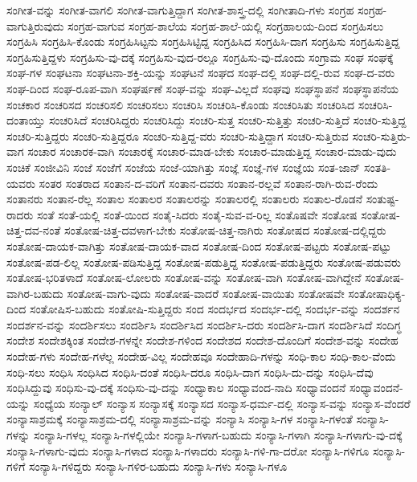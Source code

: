 {ಸಂಗೀತ-ವನ್ನು
ಸಂಗೀತ-ವಾಗಲಿ
ಸಂಗೀತ-ವಾಗುತ್ತಿದ್ದಾಗ
ಸಂಗೀತ-ಶಾಸ್ತ್ರ-ದಲ್ಲಿ
ಸಂಗೀತಾದಿ-ಗಳು
ಸಂಗ್ರಹ
ಸಂಗ್ರಹ-ವಾಗುತ್ತಿರುವುದು
ಸಂಗ್ರಹ-ವಾಗುವ
ಸಂಗ್ರಹ-ಶಾಲೆಯ
ಸಂಗ್ರಹ-ಶಾಲೆ-ಯಲ್ಲಿ
ಸಂಗ್ರಹಾಲಯ-ದಿಂದ
ಸಂಗ್ರಹಿಸಲು
ಸಂಗ್ರಹಿಸಿ
ಸಂಗ್ರಹಿಸಿ-ಕೊಂಡು
ಸಂಗ್ರಹಿಸಿಟ್ಟನು
ಸಂಗ್ರಹಿಸಿಟ್ಟಿದ್ದ
ಸಂಗ್ರಹಿಸಿದ
ಸಂಗ್ರಹಿಸಿ-ದಾಗ
ಸಂಗ್ರಹಿಸು
ಸಂಗ್ರಹಿಸುತ್ತಿದ್ದ
ಸಂಗ್ರಹಿಸುತ್ತಿದ್ದಳು
ಸಂಗ್ರಹಿಸು-ವು-ದಕ್ಕೆ
ಸಂಗ್ರಹಿಸು-ವುದ-ರಲ್ಲೂ
ಸಂಗ್ರಹಿಸು-ವು-ದೊಂದು
ಸಂಗ್ರಾಮ
ಸಂಘ
ಸಂಘಕ್ಕೆ
ಸಂಘ-ಗಳ
ಸಂಘಟನಾ
ಸಂಘಟನಾ-ಶಕ್ತಿ-ಯನ್ನು
ಸಂಘಟನೆ
ಸಂಘದ
ಸಂಘ-ದಲ್ಲಿ
ಸಂಘ-ದಲ್ಲಿ-ರುವ
ಸಂಘ-ದ-ವರು
ಸಂಘ-ದಿಂದ
ಸಂಘ-ರೂಪ-ವಾಗಿ
ಸಂಘರ್ಷಣೆ
ಸಂಘ-ವನ್ನು
ಸಂಘ-ವಿಲ್ಲದೆ
ಸಂಘವು
ಸಂಘಸ್ಥಾಪನೆ
ಸಂಘಸ್ಥಾಪನೆಯ
ಸಂಚಕಾರ
ಸಂಚರಿಸದ
ಸಂಚರಿಸಲಿ
ಸಂಚರಿಸಲು
ಸಂಚರಿಸಿ
ಸಂಚರಿಸಿ-ಕೊಂಡು
ಸಂಚರಿಸಿತು
ಸಂಚರಿಸಿದ
ಸಂಚರಿಸಿ-ದಂತಾಯ್ತು
ಸಂಚರಿಸಿದೆ
ಸಂಚರಿಸಿದ್ದರು
ಸಂಚರಿಸಿದ್ದು
ಸಂಚರಿ-ಸುತ್ತ
ಸಂಚರಿ-ಸುತ್ತಿತ್ತು
ಸಂಚರಿ-ಸುತ್ತಿದೆ
ಸಂಚರಿ-ಸುತ್ತಿದ್ದ
ಸಂಚರಿ-ಸುತ್ತಿದ್ದರು
ಸಂಚರಿ-ಸುತ್ತಿದ್ದರೂ
ಸಂಚರಿ-ಸುತ್ತಿದ್ದ-ವರು
ಸಂಚರಿ-ಸುತ್ತಿದ್ದಾಗ
ಸಂಚರಿ-ಸುತ್ತಿರುವ
ಸಂಚರಿ-ಸುತ್ತಿರು-ವಾಗ
ಸಂಚಾರ
ಸಂಚಾರಕ-ವಾಗಿ
ಸಂಚಾರಕ್ಕೆ
ಸಂಚಾರ-ಮಾಡ-ಬೇಕು
ಸಂಚಾರ-ಮಾಡುತ್ತಿದ್ದ
ಸಂಚಾರ-ಮಾಡು-ವುದು
ಸಂಚಿಕೆ
ಸಂಜೀವಿನಿ
ಸಂಜೆ
ಸಂಜೆಗೆ
ಸಂಜೆಯ
ಸಂಜೆ-ಯಾಗಿತ್ತು
ಸಂಜ್ಞೆ
ಸಂಜ್ಞೆ-ಗಳ
ಸಂಜ್ಞೆಯ
ಸಂತ-ಜಾನ್
ಸಂತತಿ-ಯವರು
ಸಂತರ
ಸಂತರಾದ
ಸಂತಾನ-ದ-ವರಿಗೆ
ಸಂತಾನ-ದವರು
ಸಂತಾನ-ರಲ್ಲವೆ
ಸಂತಾನ-ರಾಗಿ-ರುವ-ರೆಂದು
ಸಂತಾನರು
ಸಂತಾನ-ರೆಲ್ಲ
ಸಂತಾಲ
ಸಂತಾಲರ
ಸಂತಾಲರನ್ನು
ಸಂತಾಲರಲ್ಲಿ
ಸಂತಾಲರು
ಸಂತಾಲ-ರೊಡನೆ
ಸಂತುಷ್ಟ-ರಾದರು
ಸಂತೆ
ಸಂತೆ-ಯಲ್ಲಿ
ಸಂತೆ-ಯಿಂದ
ಸಂತೈ-ಸಿದರು
ಸಂತೈ-ಸುವ-ವ-ರಿಲ್ಲ
ಸಂತೊಷವೇ
ಸಂತೋಷ
ಸಂತೋಷ-ಚಿತ್ತ-ದವ-ನಂತೆ
ಸಂತೋಷ-ಚಿತ್ತ-ದವಳಾಗ-ಬೇಕು
ಸಂತೋಷ-ಚಿತ್ತ-ನಾಗಿರು
ಸಂತೋಷದ
ಸಂತೋಷ-ದಲ್ಲಿದ್ದರು
ಸಂತೋಷ-ದಾಯಕ-ವಾಗಿತ್ತು
ಸಂತೋಷ-ದಾಯಕ-ವಾದ
ಸಂತೋಷ-ದಿಂದ
ಸಂತೋಷ-ಪಟ್ಟರು
ಸಂತೋಷ-ಪಟ್ಟು
ಸಂತೋಷ-ಪಡ-ಲಿಲ್ಲ
ಸಂತೋಷ-ಪಡಿಸುತ್ತಿದ್ದ
ಸಂತೋಷ-ಪಡುತ್ತಿದ್ದ
ಸಂತೋಷ-ಪಡುತ್ತಿದ್ದರು
ಸಂತೋಷ-ಪಡುವರು
ಸಂತೋಷ-ಭರಿತಳಾದೆ
ಸಂತೋಷ-ಲೋಲರು
ಸಂತೋಷ-ವನ್ನು
ಸಂತೋಷ-ವಾಗಿ
ಸಂತೋಷ-ವಾಗಿದ್ದೇನೆ
ಸಂತೋಷ-ವಾಗಿರ-ಬಹುದು
ಸಂತೋಷ-ವಾಗು-ವುದು
ಸಂತೋಷ-ವಾದರೆ
ಸಂತೋಷ-ವಾಯಿತು
ಸಂತೋಷವೇ
ಸಂತೋಷಾಧಿಕ್ಯ-ದಿಂದ
ಸಂತೋಷಿಸ-ಬಹುದು
ಸಂತೋಷಿ-ಸುತ್ತಿದ್ದರು
ಸಂದ
ಸಂದರ್ಭದ
ಸಂದರ್ಭ-ದಲ್ಲಿ
ಸಂದರ್ಭ-ವನ್ನು
ಸಂದರ್ಶನ
ಸಂದರ್ಶನ-ವನ್ನು
ಸಂದರ್ಶಿಸಲು
ಸಂದರ್ಶಿಸಿ
ಸಂದರ್ಶಿಸಿದ
ಸಂದರ್ಶಿಸಿ-ದರು
ಸಂದರ್ಶಿಸಿ-ದಾಗ
ಸಂದರ್ಶಿಸಿದೆ
ಸಂದಿಗ್ಧ
ಸಂದೇಶ
ಸಂದೇಶಕ್ಕಿಂತ
ಸಂದೇಶ-ಗಳನ್ನೇ
ಸಂದೇಶ-ಗಳಿಂದ
ಸಂದೇಶದ
ಸಂದೇಶ-ದೊಂದಿಗೆ
ಸಂದೇಶ-ವನ್ನು
ಸಂದೇಹ
ಸಂದೇಹ-ಗಳು
ಸಂದೇಹ-ಗಳೆಲ್ಲ
ಸಂದೇಹ-ವಿಲ್ಲ
ಸಂದೇಹವೂ
ಸಂದೇಹಾದಿ-ಗಳನ್ನು
ಸಂಧಿ-ಕಾಲ
ಸಂಧಿ-ಕಾಲ-ವೆಂದು
ಸಂಧಿ-ಸಲು
ಸಂಧಿಸಿ
ಸಂಧಿಸಿದ
ಸಂಧಿಸಿ-ದಂತೆ
ಸಂಧಿಸಿ-ದರೂ
ಸಂಧಿಸಿ-ದಾಗ
ಸಂಧಿಸಿ-ದು-ದನ್ನು
ಸಂಧಿಸಿ-ದೆವು
ಸಂಧಿಸಿದ್ದುವು
ಸಂಧಿಸು-ವು-ದಕ್ಕೆ
ಸಂಧಿಸು-ವು-ದನ್ನು
ಸಂಧ್ಯಾಕಾಲ
ಸಂಧ್ಯಾವಂದ-ನಾದಿ
ಸಂಧ್ಯಾವಂದನೆ
ಸಂಧ್ಯಾವಂದನೆ-ಯನ್ನು
ಸಂಧ್ಯೆಯ
ಸಂನ್ಯಾಲ್
ಸಂನ್ಯಾಸ
ಸಂನ್ಯಾಸಕ್ಕೆ
ಸಂನ್ಯಾಸದ
ಸಂನ್ಯಾಸ-ಧರ್ಮ-ದಲ್ಲಿ
ಸಂನ್ಯಾಸ-ವನ್ನು
ಸಂನ್ಯಾಸ-ವೆಂದರೆ
ಸಂನ್ಯಾಸಾಶ್ರಮಕ್ಕೆ
ಸಂನ್ಯಾಸಾಶ್ರಮ-ದಲ್ಲಿ
ಸಂನ್ಯಾಸಾಶ್ರಮ-ವನ್ನು
ಸಂನ್ಯಾಸಿ
ಸಂನ್ಯಾಸಿ-ಗಳ
ಸಂನ್ಯಾಸಿ-ಗಳಂತೆ
ಸಂನ್ಯಾಸಿ-ಗಳನ್ನು
ಸಂನ್ಯಾಸಿ-ಗಳಲ್ಲ
ಸಂನ್ಯಾಸಿ-ಗಳಲ್ಲಿಯೇ
ಸಂನ್ಯಾಸಿ-ಗಳಾಗ-ಬಹುದು
ಸಂನ್ಯಾಸಿ-ಗಳಾಗಿ
ಸಂನ್ಯಾಸಿ-ಗಳಾಗು-ವು-ದಕ್ಕೆ
ಸಂನ್ಯಾಸಿ-ಗಳಾಗು-ವುದು
ಸಂನ್ಯಾಸಿ-ಗಳಾದ
ಸಂನ್ಯಾಸಿ-ಗಳಾದರು
ಸಂನ್ಯಾಸಿ-ಗಳಿ-ಗಾ-ದರೋ
ಸಂನ್ಯಾಸಿ-ಗಳಿಗೂ
ಸಂನ್ಯಾಸಿ-ಗಳಿಗೆ
ಸಂನ್ಯಾಸಿ-ಗಳಿದ್ದರು
ಸಂನ್ಯಾಸಿ-ಗಳಿರ-ಬಹುದು
ಸಂನ್ಯಾಸಿ-ಗಳು
ಸಂನ್ಯಾಸಿ-ಗಳೂ
}
